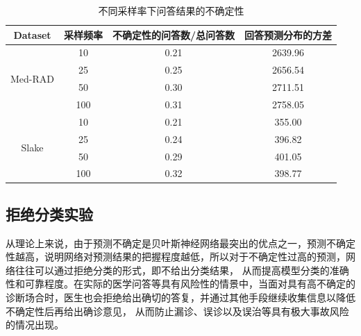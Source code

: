 \begin{table}
	\caption{\label{sample_exm}不同采样率下问答结果的不确定性}
	\centering
	\small %
	\begin{tabular}{c|ccc}
		\hline Dataset & 采样频率 & 不确定性的问答数/总问答数 & 回答预测分布的方差 \\
		\hline \multirow{4}{*}{Med-RAD} & 10 & 0.21 & 2639.96 \\
		& 25 & 0.25 & 2656.54 \\
		& 50 & 0.30 & 2711.51 \\
		& 100 & 0.31 & 2758.05 \\
		\hline \multirow{4}{*}{Slake} & 10 & 0.21 & 355.00 \\
		& 25 & 0.24 & 396.82 \\
		& 50 & 0.29 & 401.05 \\
		& 100 & 0.32 & 398.77 \\
		\hline
	\end{tabular}
\end{table}

\subsection{拒绝分类实验}
从理论上来说，由于预测不确定是贝叶斯神经网络最突出的优点之一，预测不确定性越高，说明网络对预测结果的把握程度越低，所以对于不确定性过高的预测，网络往往可以通过拒绝分类的形式，即不给出分类结果，
从而提高模型分类的准确性和可靠程度。在实际的医学问答等具有风险性的情景中，当面对具有高不确定的诊断场合时，医生也会拒绝给出确切的答复，并通过其他手段继续收集信息以降低不确定性后再给出确诊意见，
从而防止漏诊、误诊以及误治等具有极大事故风险的情况出现。

